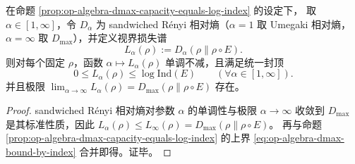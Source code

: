 \begin{corollary}\label{cor:op-algebra-renyi-loss-spectrum-capped-by-index}
在命题 \ref{prop:op-algebra-dmax-capacity-equals-log-index} 的设定下，
取 \(\alpha\in[1,\infty]\)，令 \(D_\alpha\) 为 sandwiched Rényi 相对熵（\(\alpha=1\) 取 Umegaki 相对熵，\(\alpha=\infty\) 取 \(D_{\max}\)），并定义视界损失谱
\[
L_\alpha(\rho):=D_\alpha(\rho\|\rho\!\circ\!E).
\]
则对每个固定 \(\rho\)，函数 \(\alpha\mapsto L_\alpha(\rho)\) 单调不减，且满足统一封顶
\[
\boxed{\;
0\le L_\alpha(\rho)\le \log\mathrm{Ind}(E)\qquad(\forall \alpha\in[1,\infty]).\;}
\]
并且极限 \(\lim_{\alpha\to\infty}L_\alpha(\rho)=D_{\max}(\rho\|\rho\!\circ\!E)\) 存在。
\end{corollary}
\begin{proof}
sandwiched Rényi 相对熵对参数 \(\alpha\) 的单调性与极限 \(\alpha\to\infty\) 收敛到 \(D_{\max}\) 是其标准性质，因此
\(
L_\alpha(\rho)\le L_\infty(\rho)=D_{\max}(\rho\|\rho\!\circ\!E)
\)。
再与命题 \ref{prop:op-algebra-dmax-capacity-equals-log-index} 的上界 \eqref{eq:op-algebra-dmax-bound-by-index} 合并即得。证毕。
\end{proof}

